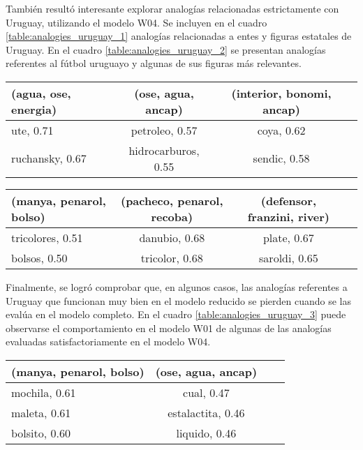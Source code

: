 También resultó interesante explorar analogías relacionadas estrictamente con Uruguay,
utilizando el modelo W04. Se incluyen en el cuadro \ref{table:analogies_uruguay_1} analogías
relacionadas a entes y figuras estatales de Uruguay. En el cuadro \ref{table:analogies_uruguay_2} se
presentan analogías referentes al fútbol uruguayo y algunas de sus figuras más relevantes.

\begin{table*}[ht]
    \centering
    \begin{tabular}{lccc}
        \hline
        (agua, ose, energia) & (ose, agua, ancap) & (interior, bonomi, ancap)\\
        \hline
        ute, 0.71 & petroleo, 0.57 & coya, 0.62\\
        ruchansky, 0.67 & hidrocarburos, 0.55 & sendic, 0.58\\
        \hline
    \end{tabular}
    \caption{Analogías relacionadas a entes públicos uruguayos.}
    \label{table:analogies_uruguay_1}
\end{table*}

\begin{table*}[ht]
    \centering
    \begin{tabular}{lccc}
        \hline
        (manya, penarol, bolso) & (pacheco, penarol, recoba) & (defensor, franzini, river)\\
        \hline
        tricolores, 0.51 & danubio, 0.68 & plate, 0.67\\
        bolsos, 0.50 & tricolor, 0.68 & saroldi, 0.65\\
        \hline
    \end{tabular}
    \caption{Analogías relacionadas al fútbol uruguayo.}
    \label{table:analogies_uruguay_2}
\end{table*}

Finalmente, se logró comprobar que, en algunos casos, las analogías referentes a Uruguay que
funcionan muy bien en el modelo reducido se pierden cuando se las evalúa en el modelo completo. En
el cuadro \ref{table:analogies_uruguay_3} puede observarse el comportamiento en el modelo W01 de
algunas de las analogías evaluadas satisfactoriamente en el modelo W04.

\begin{table*}[ht]
    \centering
    \begin{tabular}{lccc}
        \hline
        (manya, penarol, bolso) & (ose, agua, ancap)\\
        \hline
        mochila, 0.61 & cual, 0.47\\
        maleta, 0.61 & estalactita, 0.46\\
        bolsito, 0.60 & liquido, 0.46\\
        \hline
    \end{tabular}
    \caption{Analogías relacionadas a Uruguay con modelo completo.}
    \label{table:analogies_uruguay_3}
\end{table*}
